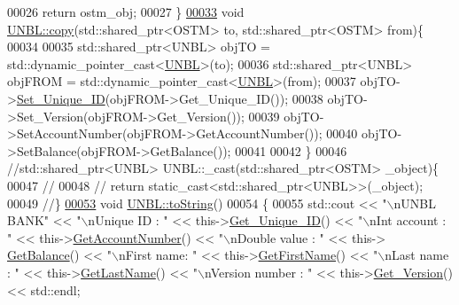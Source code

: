\begin{DoxyCode}
00026     \textcolor{keywordflow}{return} ostm\_obj;
00027 \}
\hypertarget{_u_n_b_l_8cpp_source.tex_l00033}{}\hyperlink{class_u_n_b_l_a14d5e1adc618827667d8d9524abaf31b_a14d5e1adc618827667d8d9524abaf31b}{00033} \textcolor{keywordtype}{void} \hyperlink{class_u_n_b_l_a14d5e1adc618827667d8d9524abaf31b_a14d5e1adc618827667d8d9524abaf31b}{UNBL::copy}(std::shared\_ptr<OSTM> to, std::shared\_ptr<OSTM> from)\{
00034 
00035     std::shared\_ptr<UNBL> objTO = std::dynamic\_pointer\_cast<\hyperlink{class_u_n_b_l}{UNBL}>(to);
00036     std::shared\_ptr<UNBL> objFROM = std::dynamic\_pointer\_cast<\hyperlink{class_u_n_b_l}{UNBL}>(from);
00037     objTO->\hyperlink{class_o_s_t_m_ab5019a32185631c08abbf826422f2d93_ab5019a32185631c08abbf826422f2d93}{Set\_Unique\_ID}(objFROM->Get\_Unique\_ID());
00038     objTO->Set\_Version(objFROM->Get\_Version());
00039     objTO->SetAccountNumber(objFROM->GetAccountNumber());
00040     objTO->SetBalance(objFROM->GetBalance());
00041    
00042 \}
00046 \textcolor{comment}{//std::shared\_ptr<UNBL> UNBL::\_cast(std::shared\_ptr<OSTM> \_object)\{}
00047 \textcolor{comment}{//}
00048 \textcolor{comment}{//    return static\_cast<std::shared\_ptr<UNBL>>(\_object);}
00049 \textcolor{comment}{//\}}
\hypertarget{_u_n_b_l_8cpp_source.tex_l00053}{}\hyperlink{class_u_n_b_l_a76d8bba21d64d79d8de63763b8acc1fd_a76d8bba21d64d79d8de63763b8acc1fd}{00053} \textcolor{comment}{}\textcolor{keywordtype}{void} \hyperlink{class_u_n_b_l_a76d8bba21d64d79d8de63763b8acc1fd_a76d8bba21d64d79d8de63763b8acc1fd}{UNBL::toString}()
00054 \{
00055    std::cout << \textcolor{stringliteral}{"\(\backslash\)nUNBL BANK"} << \textcolor{stringliteral}{"\(\backslash\)nUnique ID : "} << this->\hyperlink{class_o_s_t_m_a5a01a8b98d16b1d1904ecf9356e7b71d_a5a01a8b98d16b1d1904ecf9356e7b71d}{Get\_Unique\_ID}() << \textcolor{stringliteral}{"\(\backslash\)nInt account :
       "} << this->\hyperlink{class_u_n_b_l_a44a84fb7fe8778e3048921581049c715_a44a84fb7fe8778e3048921581049c715}{GetAccountNumber}() << \textcolor{stringliteral}{"\(\backslash\)nDouble value : "} << this->
      \hyperlink{class_u_n_b_l_ad5b882bff8d1e2619b2ebbd170345c99_ad5b882bff8d1e2619b2ebbd170345c99}{GetBalance}() << \textcolor{stringliteral}{"\(\backslash\)nFirst name: "} << this->\hyperlink{class_u_n_b_l_ae89215b95f2e11aa70f9c8bbfd55c10c_ae89215b95f2e11aa70f9c8bbfd55c10c}{GetFirstName}() << \textcolor{stringliteral}{"\(\backslash\)nLast name : "} << 
      this->\hyperlink{class_u_n_b_l_a27f19f2af5e1abd33b5c63f16b493f6c_a27f19f2af5e1abd33b5c63f16b493f6c}{GetLastName}()  << \textcolor{stringliteral}{"\(\backslash\)nVersion number : "} << this->\hyperlink{class_o_s_t_m_a1f1db9d482f22c8e7caa17dfb340626b_a1f1db9d482f22c8e7caa17dfb340626b}{Get\_Version}() << std::endl;

\end{DoxyCode}
